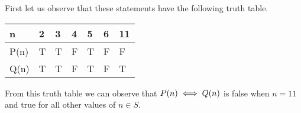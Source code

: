 \documentclass[12pt]{article}
\makeatletter
\newcommand*{\arabicodd}[1]{%
  \expandafter\@arabicodd\csname c@#1\endcsname
}
\newcommand*{\@arabicodd}[1]{%
  \@arabic{\numexpr(#1)*2-1\relax}%
}
\makeatother
\begin{document}
\begin{enumerate}[label=2.\arabicodd*, start=18]
        First let us observe that these statements have the following truth table.
        \hfill
        \hfill
        \linebreak
        \linebreak
        \begin{minipage}{0.4\linewidth}
          \begin{tabular}{@{}lllllll@{}}
            \toprule
            n    & 2 & 3 & 4 & 5 & 6 & 11 \\ \midrule
            P(n) & T & T & F & T & F & F  \\
            Q(n) & T & T & F & T & F & T  \\ \bottomrule
          \end{tabular}
        \end{minipage}
        \linebreak
        \linebreak
        From this truth table we can observe that $P\qty(n) \iff Q\qty(n)$ is
        false when $n=11$ and true for all other values of $n \in S.$
\end{enumerate}
\end{document}
